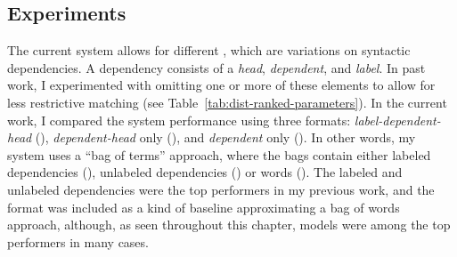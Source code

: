 \subsection{ Experiments}
\label{sec:exp-term-reps}
The current system allows for different , which are variations on syntactic dependencies. A dependency consists of a \textit{head}, \textit{dependent}, and \textit{label}. In past work, I experimented with omitting one or more of these elements to allow for less restrictive matching (see Table~\ref{tab:dist-ranked-parameters}). In the current work, I compared the system performance using three formats: \textit{label-dependent-head} (), \textit{dependent-head} only (), and \textit{dependent} only (). In other words, my system uses a ``bag of terms'' approach, where the bags contain either labeled dependencies (), unlabeled dependencies () or words (). The labeled and unlabeled dependencies were the top performers in my previous work, and the  format was included as a kind of baseline approximating a bag of words approach, although, as seen throughout this chapter,  models were among the top performers in many cases.

